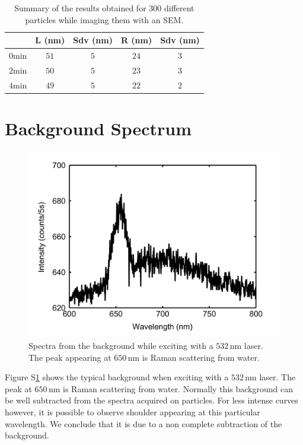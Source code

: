 \documentclass[a4paper,oneside,onecolumn]{article}
\newcommand{\nm}{\ensuremath{\,\textrm{nm}}}
\begin{document}
\begin{table}[htp]
\begin{tabular*}{0.48\textwidth}{c c c c c}
 $\,$ & L (nm) & Sdv (nm) & R (nm) & Sdv (nm) \\\hline
 $0\textrm{min}$ & $51$ & $5$ & $24$ & $3$ \\ 
 $2\textrm{min}$ & $50$ & $5$ & $23$ & $3$ \\
 $4\textrm{min}$ & $49$ & $5$ & $22$ & $2$ \\
\end{tabular*}
\label{tab:SEM_results}
\caption{Summary of the results obtained for 300 different particles while
imaging them with an SEM.}
\end{table}

\section{Background Spectrum}
\begin{figure}[htp]
 \centering
 \includegraphics[width=0.95\linewidth]{Figures/04_Supporting/03_Background/background.png}
 \caption{Spectra from the background while exciting with a $532\nm$ laser. The
 peak appearing at $650\nm$ is Raman scattering from water.}
 \label{fig:Background}
\end{figure}

Figure S\ref{fig:Background} shows the typical background when exciting with a
$532\nm$ laser. The peak at $650\nm$ is Raman scattering from water. Normally
this background can be well subtracted from the spectra acquired on particles.
For less intense curves however, it is possible to observe shoulder appearing
at this particular wavelength. We conclude that it is due to a non complete
subtraction of the background. 
\end{document}
